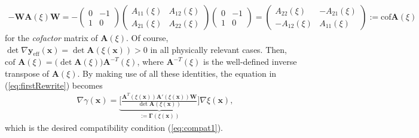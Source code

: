 \documentclass[aps,11pt,tightenlines,notitlepage,superscriptaddress,longbibliography,nofootinbib]{revtex4-1}
\begin{document}
\begin{equation}
    \begin{aligned}\label{eq:coolIdent}
    -\mathbf{W} \mathbf{A}(\xi) \mathbf{W} = -\left(\begin{array}{cc} 0 & -1 \\ 
    1 & 0  \end{array}\right) \left(\begin{array}{cc} A_{11}(\xi) & A_{12}(\xi) \\ 
    A_{21}(\xi) & A_{22}(\xi)  \end{array}\right)\left(\begin{array}{cc} 0 & -1 \\ 
    1 & 0  \end{array}\right) = \left(\begin{array}{cc} A_{22}(\xi) & -A_{21}(\xi) \\ 
    -A_{12}(\xi) & A_{11}(\xi)  \end{array}\right) := \text{cof} \mathbf{A}(\xi)
    \end{aligned}
\end{equation}
for the \textit{cofactor} matrix of $\mathbf{A}(\xi)$.
Of course, $\det \nabla \mathbf{y}_{\text{eff}}(\mathbf{x})  = \det \mathbf{A}(\xi(\mathbf{x}))>0$ in all physically relevant cases. Then,  $\text{cof }\mathbf{A}(\xi) = \big(\det \mathbf{A}(\xi) \big) \mathbf{A}^{-T}(\xi)$, where $\mathbf{A}^{-T}(\xi)$ is the well-defined inverse transpose of $\mathbf{A}(\xi)$. By making use of all these identities, the equation in (\ref{eq:firstRewrite}) becomes
\begin{equation}
\begin{aligned}\label{eq:finalCompat}
\nabla \gamma(\mathbf{x}) =\underbrace{\Big[  \frac{\mathbf{A}^T(\xi(\mathbf{x})) \mathbf{A}'(\xi(\mathbf{x})) \mathbf{W}}{\det \mathbf{A}(\xi(\mathbf{x}))} \Big]}_{:= \boldsymbol{\Gamma}(\xi(\mathbf{x}))} \nabla \xi(\mathbf{x}),
\end{aligned}
\end{equation}
which is the desired compatibility condition (\ref{eq:compat1}).


\end{document}
